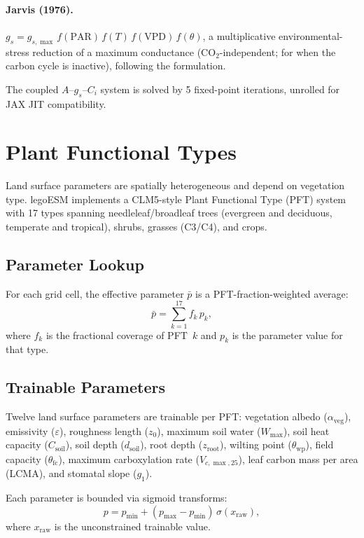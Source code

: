 \documentclass[11pt,twoside]{report}
\begin{document}
\paragraph{Jarvis (1976).}
$g_s = g_{s,\max}\,f(\mathrm{PAR})\,f(T)\,f(\mathrm{VPD})\,f(\theta)$,
a multiplicative environmental-stress reduction of a maximum conductance
(CO$_2$-independent; for when the carbon cycle is inactive), following the
\citet{Jarvis1976} formulation.

The coupled $A$--$g_s$--$C_i$ system is solved by 5 fixed-point
iterations, unrolled for JAX JIT compatibility.


\section{Plant Functional Types}
\label{sec:pft}

Land surface parameters are spatially heterogeneous and depend on vegetation type.  legoESM implements a CLM5-style Plant Functional Type (PFT) system with 17 types spanning needleleaf/broadleaf trees (evergreen and deciduous, temperate and tropical), shrubs, grasses (C3/C4), and crops.

\subsection{Parameter Lookup}

For each grid cell, the effective parameter $\bar{p}$ is a PFT-fraction-weighted average:
\begin{equation}
  \bar{p} = \sum_{k=1}^{17} f_k\,p_k,
\end{equation}
where $f_k$ is the fractional coverage of PFT~$k$ and $p_k$ is the parameter value for that type.

\subsection{Trainable Parameters}

Twelve land surface parameters are trainable per PFT: vegetation albedo ($\alpha_{\mathrm{veg}}$), emissivity ($\varepsilon$), roughness length ($z_0$), maximum soil water ($W_{\max}$), soil heat capacity ($C_{\mathrm{soil}}$), soil depth ($d_{\mathrm{soil}}$), root depth ($z_{\mathrm{root}}$), wilting point ($\theta_{\mathrm{wp}}$), field capacity ($\theta_{\mathrm{fc}}$), maximum carboxylation rate ($V_{c,\max,25}$), leaf carbon mass per area (LCMA), and stomatal slope ($g_1$).

Each parameter is bounded via sigmoid transforms:
\begin{equation}
  p = p_{\min} + (p_{\max}-p_{\min})\,\sigma(x_{\mathrm{raw}}),
\end{equation}
where $x_{\mathrm{raw}}$ is the unconstrained trainable value.
\end{document}
